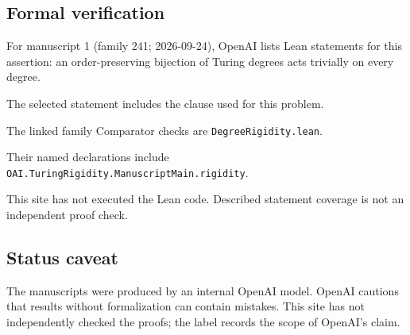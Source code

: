 \documentclass[11pt]{article}
\begin{document}
\subsection{Formal verification}
For manuscript 1 (family 241; 2026-09-24), OpenAI lists Lean statements for this assertion: an order-preserving bijection of Turing degrees acts trivially on every degree.

The selected statement includes the clause used for this problem.

The linked family Comparator checks are \texttt{DegreeRigidity.lean}.

Their named declarations include \texttt{OAI.TuringRigidity.ManuscriptMain.rigidity}.

This site has not executed the Lean code. Described statement coverage is not an independent proof check.

\subsection{Status caveat}
The manuscripts were produced by an internal OpenAI model. OpenAI cautions that results without formalization can contain mistakes. This site has not independently checked the proofs; the label records the scope of OpenAI's claim.
\end{document}
